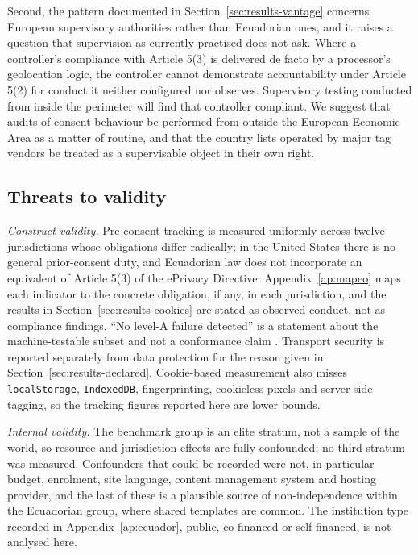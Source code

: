 \documentclass[pdflatex,sn-basic,Numbered,iicol]{sn-jnl}
\theoremstyle{thmstyleone}
\theoremstyle{thmstyletwo}
\theoremstyle{thmstylethree}
\begin{document}
Second, the pattern documented in Section~\ref{sec:results-vantage} concerns European supervisory authorities rather than Ecuadorian ones, and it raises a question that supervision as currently practised does not ask. Where a controller's compliance with Article 5(3) is delivered de facto by a processor's geolocation logic, the controller cannot demonstrate accountability under Article 5(2) for conduct it neither configured nor observes. Supervisory testing conducted from inside the perimeter will find that controller compliant. We suggest that audits of consent behaviour be performed from outside the European Economic Area as a matter of routine, and that the country lists operated by major tag vendors be treated as a supervisable object in their own right.

\subsection{Threats to validity}\label{sec:threats}

\emph{Construct validity.} Pre-consent tracking is measured uniformly across twelve jurisdictions whose obligations differ radically; in the United States there is no general prior-consent duty, and Ecuadorian law does not incorporate an equivalent of Article 5(3) of the ePrivacy Directive. Appendix~\ref{ap:mapeo} maps each indicator to the concrete obligation, if any, in each jurisdiction, and the results in Section~\ref{sec:results-cookies} are stated as observed conduct, not as compliance findings. ``No level-A failure detected'' is a statement about the machine-testable subset and not a conformance claim \citep{fischer2025coverage}. Transport security is reported separately from data protection for the reason given in Section~\ref{sec:results-declared}. Cookie-based measurement also misses \verb|localStorage|, \verb|IndexedDB|, fingerprinting, cookieless pixels and server-side tagging, so the tracking figures reported here are lower bounds.

\emph{Internal validity.} The benchmark group is an elite stratum, not a sample of the world, so resource and jurisdiction effects are fully confounded; no third stratum was measured. Confounders that could be recorded were not, in particular budget, enrolment, site language, content management system and hosting provider, and the last of these is a plausible source of non-independence within the Ecuadorian group, where shared templates are common. The institution type recorded in Appendix~\ref{ap:ecuador}, public, co-financed or self-financed, is not analysed here.
\end{document}
